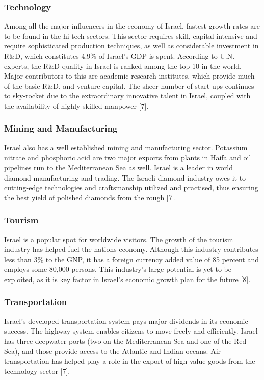 \documentclass[10pt]{article}
\begin{document}
\subsubsection{Technology}
Among all the major influencers in the economy of Israel, fastest growth rates are to be found in the hi-tech sectors. This sector requires skill, capital intensive and require sophisticated production techniques, as well as considerable investment in R\&D, which constitutes 4.9\% of Israel's GDP is spent. According to U.N. experts, the R\&D quality in Israel is ranked among the top 10 in the world. Major contributors to this are academic research institutes, which provide much of the basic R\&D, and venture capital. The sheer number of start-ups continues to sky-rocket due to the extraordinary innovative talent in Israel, coupled with the availability of highly skilled manpower [7].

\subsubsection{Mining and Manufacturing}
Israel also has a well established mining and manufacturing sector. Potassium nitrate and phosphoric acid are two major exports from plants in Haifa and oil pipelines run to the Mediterranean Sea as well. Israel is a leader in world diamond manufacturing and trading. The Israeli diamond industry owes it to cutting-edge technologies and craftsmanship utilized and practised, thus ensuring the best yield of polished diamonds from the rough [7].
 
\subsubsection{Tourism}
Israel is a popular spot for worldwide visitors. The growth of the tourism industry has helped fuel the nations economy.  Although this industry contributes less than 3\% to the GNP, it has a foreign currency added value of 85 percent and employs some 80,000 persons. This industry's large potential is yet to be exploited, as it is key factor in Israel's economic growth plan for the future [8].

\subsubsection{Transportation}
Israel’s developed transportation system pays major dividends in its economic success. The highway system enables citizens to move freely and efficiently. Israel has three deepwater ports (two on the Mediterranean Sea and one of the Red Sea), and those provide access to the Atlantic and Indian oceans. Air transportation has helped play a role in the export of high-value goods from the technology sector [7].
\end{document}
